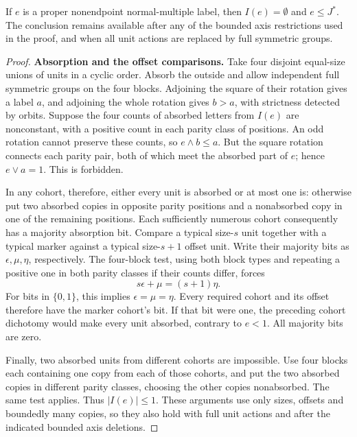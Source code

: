 \begin{lemma}\label{t:weighted-normal-internal}
If \(e\) is a proper nonendpoint normal-multiple label, then
\(I(e)=\emptyset\) and \(e\le J^*\).
The conclusion remains available after any of the bounded axis restrictions
used in the proof, and when all unit actions are replaced by full symmetric
groups.
\end{lemma}
\begin{proof}
\noindent\textbf{Absorption and the offset comparisons.}
Take four disjoint equal-size unions of units in a cyclic order.
Absorb the outside and allow independent full symmetric groups on
the four blocks.  Adjoining the square of their rotation gives a
label \(a\), and adjoining the whole rotation gives \(b>a\), with
strictness detected by orbits.  Suppose the four counts of absorbed
letters from \(I(e)\) are nonconstant, with a positive count in each
parity class of positions.  An odd rotation cannot preserve these
counts, so \(e\wedge b\le a\).  But the square rotation connects
each parity pair, both of which meet the absorbed part of \(e\);
hence \(e\vee a=1\).  This is forbidden.

In any cohort, therefore, either every unit is absorbed or at most
one is: otherwise put two absorbed copies in opposite parity
positions and a nonabsorbed copy in one of the remaining positions.
Each sufficiently numerous cohort consequently has a majority
absorption bit.  Compare a typical size-\(s\) unit together with
a typical marker against a typical size-\(s+1\) offset unit.
Write their majority bits as \(\epsilon,\mu,\eta\), respectively.
The four-block test, using both block types and repeating a positive
one in both parity classes if their counts differ, forces
\[
 s\epsilon+\mu=(s+1)\eta.
\]
For bits in \(\{0,1\}\), this implies
\(\epsilon=\mu=\eta\).  Every required cohort and its offset
therefore have the marker cohort's bit.  If that bit were one,
the preceding cohort dichotomy would make every unit absorbed,
contrary to \(e<1\).  All majority bits are zero.

Finally, two absorbed units from different cohorts are impossible.
Use four blocks each containing one copy from each of those cohorts,
and put the two absorbed copies in different parity classes, choosing
the other copies nonabsorbed.  The same test applies.  Thus
\(|I(e)|\le1\).  These arguments use only sizes, offsets and
boundedly many copies, so they also hold with full unit actions
and after the indicated bounded axis deletions.


\end{proof}
